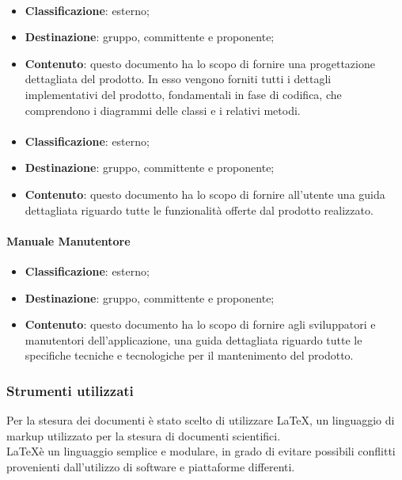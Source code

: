 		\paragraph{\DDP}
		\begin{itemize}
			\item \textbf{Classificazione}: esterno;
			\item \textbf{Destinazione}: gruppo, committente e proponente;
			\item \textbf{Contenuto}: questo documento ha lo scopo di fornire una progettazione dettagliata del
			prodotto. In esso vengono forniti tutti i dettagli implementativi del prodotto, fondamentali in fase di codifica, che comprendono i diagrammi delle classi e i relativi metodi.
		\end{itemize}
	
		\paragraph{\MU}
		\begin{itemize}
			\item \textbf{Classificazione}: esterno;
			\item \textbf{Destinazione}: gruppo, committente e proponente;
			\item \textbf{Contenuto}: questo documento ha lo scopo di fornire all'utente una guida dettagliata riguardo tutte le funzionalità offerte dal prodotto realizzato.
		\end{itemize}
	
		\paragraph{Manuale Manutentore}
		\begin{itemize}
			\item \textbf{Classificazione}: esterno;
			\item \textbf{Destinazione}: gruppo, committente e proponente;
			\item \textbf{Contenuto}: questo documento ha lo scopo di fornire agli sviluppatori e manutentori dell'applicazione, una guida dettagliata riguardo tutte le specifiche tecniche e tecnologiche per il mantenimento del prodotto.
		\end{itemize}

		\subsubsection{Strumenti utilizzati}
		Per la stesura dei documenti è stato scelto di utilizzare \LaTeX, un linguaggio di markup utilizzato per la stesura di documenti scientifici.\\
		\LaTeX è un linguaggio semplice e modulare, in grado di evitare possibili conflitti provenienti dall'utilizzo di software e piattaforme differenti.
